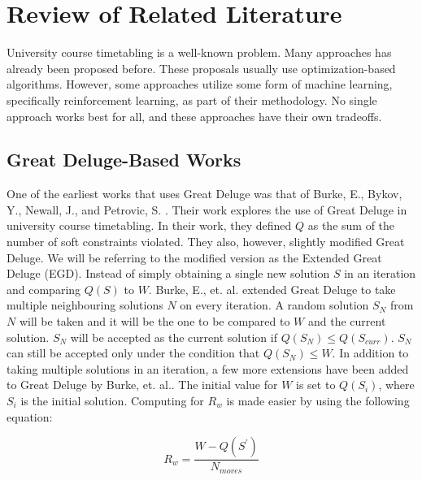 \chapter{Review of Related Literature} \label{sec:rrl-title}
University course timetabling is a well-known problem. Many approaches has already been proposed before. These proposals usually use optimization-based algorithms. However, some approaches utilize some form of machine learning, specifically reinforcement learning, as part of their methodology. No single approach works best for all, and these approaches have their own tradeoffs.

\section{Great Deluge-Based Works}
One of the earliest works that uses Great Deluge was that of Burke, E., Bykov, Y., Newall, J., and Petrovic, S. \cite{gd-burke}. Their work explores the use of Great Deluge in university course timetabling. In their work, they defined $Q$ as the sum of the number of soft constraints violated. They also, however, slightly modified Great Deluge. We will be referring to the modified version as the Extended Great Deluge (EGD). Instead of simply obtaining a single new solution $S$ in an iteration and comparing $Q(S)$ to $W$. Burke, E., et. al. extended Great Deluge to take multiple neighbouring solutions $N$ on every iteration. A random solution $S_{N}$ from $N$ will be taken and it will be the one to be compared to $W$ and the current solution. $S_{N}$ will be accepted as the current solution if $Q(S_{N}) \leq Q(S_{curr})$. $S_{N}$ can still be accepted only under the condition that $Q(S_{N}) \leq W$. In addition to taking multiple solutions in an iteration, a few more extensions have been added to Great Deluge by Burke, et. al.. The initial value for $W$ is set to $Q(S_{i})$, where $S_{i}$ is the initial solution. Computing for $R_{w}$ is made easier by using the following equation:

\[
    R_{w} = \frac{W - Q(S^{'})}{N_{moves}}
\]


